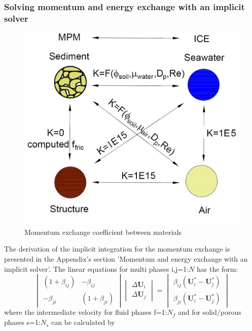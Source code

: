 \documentclass[preprint,12pt]{elsarticle}
\begin{document}
\subsubsection{Solving momentum and energy exchange with an implicit solver}
%
%
\begin{figure}[h]
\center
\includegraphics[scale=1.0]{K.jpg}
\caption{Momentum exchange coefficient between materials}
\label{fig:K}
\end {figure}
%
%
The derivation of the implicit integration for the momentum exchange is presented in the Appendix's section 'Momentum and energy exchange with an implicit solver'. The linear equations for multi phases i,j=1:$N$
has the form:
%
\[ \begin{vmatrix} (1 + \beta_{ij})  &  -\beta_{ij} \\
                  -\beta_{ji}       &  (1 + \beta_{ji})
    \end {vmatrix}
    \begin{vmatrix} \Delta \pmb{U}_{i} \\
                    \Delta \pmb{U}_{j}
    \end {vmatrix}
    =
    \begin{vmatrix}  \beta_{ij}(\pmb{U}_{i}^{*} - \pmb{U}_{j}^{*}) \\
                    \beta_{ji}(\pmb{U}_{i}^{*} - \pmb{U}_{j}^{*})
    \end {vmatrix}                
\]
%
%
where the intermediate velocity for fluid phases f=1:$N_f$ and for solid/porous phases s=1:$N_s$ can be calculated by
\end{document}
